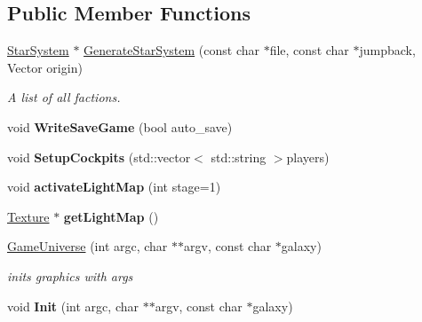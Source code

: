\subsection*{Public Member Functions}
\begin{DoxyCompactItemize}
\item 
\hyperlink{classStarSystem}{Star\+System} $\ast$ \hyperlink{classGameUniverse_ac2317f5bc265b0dbfc9d00be2e4ea20b}{Generate\+Star\+System} (const char $\ast$file, const char $\ast$jumpback, Vector origin)\hypertarget{classGameUniverse_ac2317f5bc265b0dbfc9d00be2e4ea20b}{}\label{classGameUniverse_ac2317f5bc265b0dbfc9d00be2e4ea20b}

\begin{DoxyCompactList}\small\item\em A list of all factions. \end{DoxyCompactList}\item 
void {\bfseries Write\+Save\+Game} (bool auto\+\_\+save)\hypertarget{classGameUniverse_afa16d96039777dca774da1d7a409dc32}{}\label{classGameUniverse_afa16d96039777dca774da1d7a409dc32}

\item 
void {\bfseries Setup\+Cockpits} (std\+::vector$<$ std\+::string $>$players)\hypertarget{classGameUniverse_ad54be1a76b1e5a26e0baed51bb26bd33}{}\label{classGameUniverse_ad54be1a76b1e5a26e0baed51bb26bd33}

\item 
void {\bfseries activate\+Light\+Map} (int stage=1)\hypertarget{classGameUniverse_aed979389e1cbb1d94ebdfc63e39236d5}{}\label{classGameUniverse_aed979389e1cbb1d94ebdfc63e39236d5}

\item 
\hyperlink{classTexture}{Texture} $\ast$ {\bfseries get\+Light\+Map} ()\hypertarget{classGameUniverse_a166021f29be438f91c004498a1d57469}{}\label{classGameUniverse_a166021f29be438f91c004498a1d57469}

\item 
\hyperlink{classGameUniverse_a7aea55ebb828e4e6174639d559f5dab7}{Game\+Universe} (int argc, char $\ast$$\ast$argv, const char $\ast$galaxy)\hypertarget{classGameUniverse_a7aea55ebb828e4e6174639d559f5dab7}{}\label{classGameUniverse_a7aea55ebb828e4e6174639d559f5dab7}

\begin{DoxyCompactList}\small\item\em inits graphics with args \end{DoxyCompactList}\item 
void {\bfseries Init} (int argc, char $\ast$$\ast$argv, const char $\ast$galaxy)\hypertarget{classGameUniverse_ad5156e0f251f934187ddac03c01cb213}{}\label{classGameUniverse_ad5156e0f251f934187ddac03c01cb213}


\end{DoxyCompactItemize}
